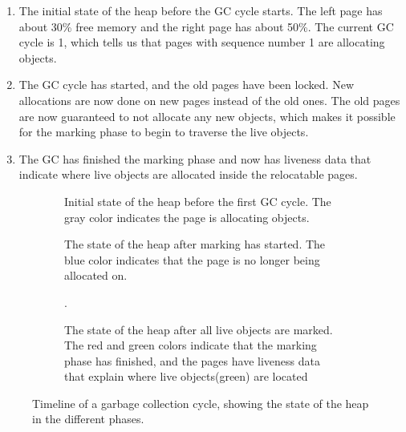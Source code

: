 \begin{enumerate}[label=\alph*)]
    \item The initial state of the heap before the GC cycle starts. The left page has about 30\% free memory and the right page has about 50\%. The current GC cycle is 1, which tells us that pages with sequence number 1 are allocating objects.
    \item The GC cycle has started, and the old pages have been locked. New allocations are now done on new pages instead of the old ones. The old pages are now guaranteed to not allocate any new objects, which makes it possible for the marking phase to begin to traverse the live objects.
    \item The GC has finished the marking phase and now has liveness data that indicate where live objects are allocated inside the relocatable pages.
\end{enumerate}

\vspace*{-0.4cm}

\begin{figure}[H]
    \centering
    \begin{subfigure}[t]{.214\textwidth}
        \centering
        
        \caption{Initial state of the heap before the first GC cycle. The gray color indicates the page is allocating objects.}
        \label{fig:zrel1}
    \end{subfigure}
    \hfill\vline\hfill
    \begin{subfigure}[t]{.32\textwidth}
        \centering
        
        \caption{The state of the heap after marking has started. The blue color indicates that the page is no longer being allocated on.}
        \label{fig:zrel2}
    \end{subfigure}
    \hfill\vline\hfill
    \begin{subfigure}[t]{.32\textwidth}
        \centering
        
        \caption{The state of the heap after all live objects are marked. The red and green colors indicate that the marking phase has finished, and the pages have liveness data that explain where live objects(green) are located}.
        \label{fig:zrel3}
    \end{subfigure}
    \caption{Timeline of a garbage collection cycle, showing the state of the heap in the different phases.}
    \label{fig:zgc_timeline}
\end{figure}

